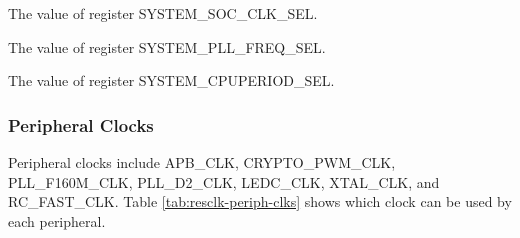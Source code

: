 \documentclass[main\_\_EN.tex]{subfiles}
\begin{document}
\begin{table}[H]
\begin{threeparttable}
        \begin{tablenotes}
            \item[*] The value of register  SYSTEM\_SOC\_CLK\_SEL.
            \item[*] The value of register  SYSTEM\_PLL\_FREQ\_SEL.
            \item[*] The value of register  SYSTEM\_CPUPERIOD\_SEL.
        \end{tablenotes}
     \end{threeparttable}
    \end{table}

\subsubsection{Peripheral Clocks}
Peripheral clocks include APB\_CLK, CRYPTO\_PWM\_CLK, PLL\_F160M\_CLK, PLL\_D2\_CLK, LEDC\_CLK, XTAL\_CLK, and RC\_FAST\_CLK. Table \ref{tab:resclk-periph-clks} shows which clock can be used by each peripheral.
\end{document}
